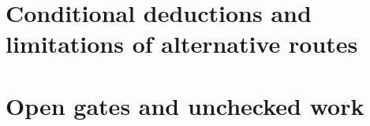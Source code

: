 \documentclass[11pt]{article}
\theoremstyle{remark}\newtheorem{remark}[theorem]{Remark}
\begin{document}



















\part{Conditional deductions and limitations of alternative routes}


\part{Open gates and unchecked work}
\end{document}
